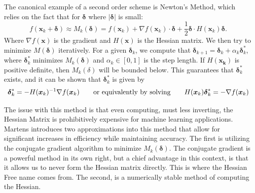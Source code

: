 \documentclass[]{article}
\newcommand{\abs}[1]{\left|#1\right|}
\newcommand{\B}[1]{\boldsymbol{#1}}
\theoremstyle{plain}
\theoremstyle{definition}
\begin{document}
The canonical example of a second order scheme is Newton's Method, which relies on the fact that for $ \B{\delta} $ where $ \abs{\B{\delta} } $ is small:
\[ f(\B{x}_k+\B{\delta}) \approx M_k(\B{\delta} ) = f(\B{x}_k) + \nabla f(\B{x}_k)\cdot\B{\delta} + \frac{1}{2}\B{\delta}\cdot H(\B{x}_k)\B{\delta}.\]
Where $ \nabla f(\B{x}) $ is the gradient and $ H(\B{x}) $ is the Hessian matrix. We then try to minimize $ M(\B{\delta}) $ iteratively. For a given $ \B{\delta}_k $, we compute that $ \B{\delta}_{k+1} = \B{\delta}_k + \alpha_k\B{\delta}_k^* $, where $ \B{\delta}_k^* $ minimizes $ M_k(\B{\delta}) $ and $ \alpha_k\in[0,1] $ is the step length. If $ H(\B{x_k}) $ is positive definite, then $ M_k(\delta) $ will be bounded below. This guarantees that $ \B{\delta}_k^* $ exists, and it can be shown that $ \B{\delta}_k^* $ is given by
\[ \B{\delta}_k^* = -H(\B{x}_k)^{-1}\nabla f(\B{x}_k) \text{\qquad or equivalently by solving\qquad} H(\B{x}_k)\B{\delta}_k^* = -\nabla f(\B{x}_k) \]

The issue with this method is that even computing, must less inverting, the Hessian Matrix is prohibitively expensive for machine learning applications. Martens introduces two approximations into this method that allow for significant increases in efficiency while maintaining accuracy. The first is utilizing the conjugate gradient algorithm to minimize $ M_k(\B{\delta}) $. The conjugate gradient is a powerful method in its own right, but a chief advantage in this context, is that it allows us to never form the Hessian matrix directly. This is where the Hessian Free name comes from. The second, is a numerically stable method of computing the Hessian.
\end{document}

